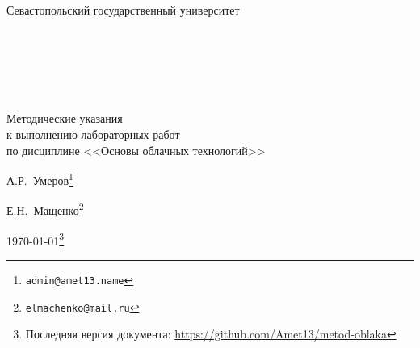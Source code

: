 
\begin{center}

\Large{Севастопольский государственный университет}

{~}\bigskip %

{~}\bigskip

{~}\bigskip

\Huge{Методические указания \\
к выполнению лабораторных работ \\
по дисциплине <<Основы облачных технологий>>} %

\vspace{1em}

\Large{А.Р.~Умеров}\footnote{\texttt{admin@amet13.name}} %

\Large{Е.Н.~Мащенко}\footnote{\texttt{elmachenko@mail.ru}} %

\Large{\today}\footnote{Последняя версия документа: \url{https://github.com/Amet13/metod-oblaka}} %

\end{center}

\clearpage %
